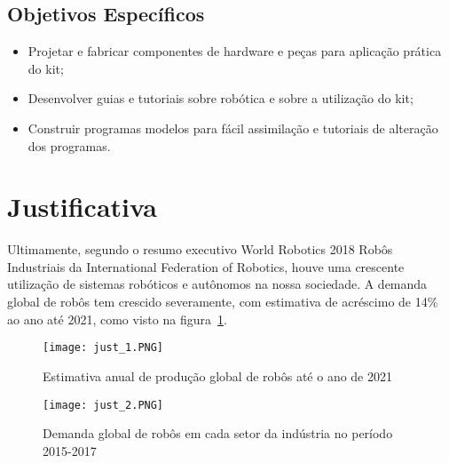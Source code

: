 \subsection{Objetivos Específicos}
\begin{itemize}
	\item Projetar e fabricar componentes de hardware e peças para aplicação prática do kit;
	\item Desenvolver guias e tutoriais sobre robótica e sobre a utilização do kit;
	\item Construir programas modelos para fácil assimilação e tutoriais de alteração dos programas.
	
\end{itemize}

\section{Justificativa}
Ultimamente, segundo o resumo executivo World Robotics 2018 Robôs Industriais da International Federation of Robotics\cite{ifr2018}, houve uma crescente utilização de sistemas robóticos e autônomos na nossa sociedade. A demanda global de robôs tem crescido severamente, com estimativa de acréscimo de 14\% ao ano até 2021, como visto na figura~\ref{fig:just_1}.

\begin{figure}[h!]										\caption{Estimativa anual de produção global de robôs até o ano de 2021} \label{fig:just_1}		
	\centering										
	\texttt{[image: just\_1.PNG]}
\end{figure}

\begin{figure}[h!]										\caption{Demanda global de robôs em cada setor da indústria no período 2015-2017} \label{fig:just_2}		
	\centering										
	\texttt{[image: just\_2.PNG]}
\end{figure}

